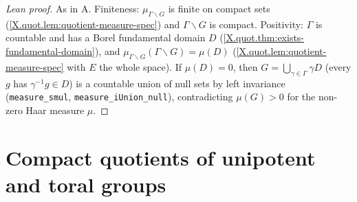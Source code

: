 \begin{proof}[Lean proof]
As in A. Finiteness: $\mu_{\Gamma\backslash G}$ is finite on compact sets (\cref{X.quot.lem:quotient-measure-spec}) and $\Gamma\backslash G$ is compact. Positivity: $\Gamma$ is countable and has a Borel fundamental domain $D$ (\cref{X.quot.thm:exists-fundamental-domain}), and $\mu_{\Gamma\backslash G}(\Gamma\backslash G)=\mu(D)$ (\cref{X.quot.lem:quotient-measure-spec} with $E$ the whole space). If $\mu(D)=0$, then $G=\bigcup_{\gamma\in\Gamma}\gamma D$ (every $g$ has $\gamma^{-1}g\in D$) is a countable union of null sets by left invariance (\texttt{measure\_smul}, \texttt{measure\_iUnion\_null}), contradicting $\mu(G)>0$ for the non-zero Haar measure $\mu$.
\end{proof}

\section{Compact quotients of unipotent and toral groups}

